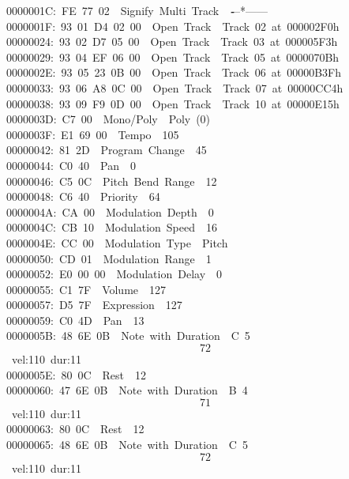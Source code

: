\documentclass[
]{book}
\begin{document}
0000001C:~FE~77~02~\textbar~Signify~Multi~Track~\textbar~\textbf{\emph{-}}--*------\\
0000001F:~93~01~D4~02~00~\textbar~Open~Track~\textbar~Track~02~at~000002F0h\\
00000024:~93~02~D7~05~00~\textbar~Open~Track~\textbar~Track~03~at~000005F3h\\
00000029:~93~04~EF~06~00~\textbar~Open~Track~\textbar~Track~05~at~0000070Bh\\
0000002E:~93~05~23~0B~00~\textbar~Open~Track~\textbar~Track~06~at~00000B3Fh\\
00000033:~93~06~A8~0C~00~\textbar~Open~Track~\textbar~Track~07~at~00000CC4h\\
00000038:~93~09~F9~0D~00~\textbar~Open~Track~\textbar~Track~10~at~00000E15h\\
0000003D:~C7~00~\textbar~Mono/Poly~\textbar~Poly~(0)\\
0000003F:~E1~69~00~\textbar~Tempo~\textbar~105\\
00000042:~81~2D~\textbar~Program~Change~\textbar~45\\
00000044:~C0~40~\textbar~Pan~\textbar~0\\
00000046:~C5~0C~\textbar~Pitch~Bend~Range~\textbar~12\\
00000048:~C6~40~\textbar~Priority~\textbar~64\\
0000004A:~CA~00~\textbar~Modulation~Depth~\textbar~0\\
0000004C:~CB~10~\textbar~Modulation~Speed~\textbar~16\\
0000004E:~CC~00~\textbar~Modulation~Type~\textbar~Pitch\\
00000050:~CD~01~\textbar~Modulation~Range~\textbar~1\\
00000052:~E0~00~00~\textbar~Modulation~Delay~\textbar~0\\
00000055:~C1~7F~\textbar~Volume~\textbar~127\\
00000057:~D5~7F~\textbar~Expression~\textbar~127\\
00000059:~C0~4D~\textbar~Pan~\textbar~13\\
0000005B:~48~6E~0B~\textbar~Note~with~Duration~\textbar~C~5~\[72\]~vel:110~dur:11\\
0000005E:~80~0C~\textbar~Rest~\textbar~12\\
00000060:~47~6E~0B~\textbar~Note~with~Duration~\textbar~B~4~\[71\]~vel:110~dur:11\\
00000063:~80~0C~\textbar~Rest~\textbar~12\\
00000065:~48~6E~0B~\textbar~Note~with~Duration~\textbar~C~5~\[72\]~vel:110~dur:11\\
\end{document}
